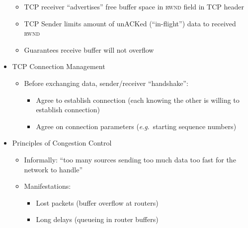 \begin{itemize}
\begin{itemize}
\begin{itemize}
        \end{itemize}

      \item TCP receiver ``advertises'' free buffer space in \textsc{rwnd} field in TCP header

      \item TCP Sender limits amount of unACKed (``in-flight'') data to received \textsc{rwnd}

      \item Guarantees receive buffer will not overflow

    \end{itemize}

  \item TCP Connection Management

    \begin{itemize}

      \item Before exchanging data, sender/receiver ``handshake'':

        \begin{itemize}

          \item Agree to establish connection (each knowing the other is willing to establish connection)

          \item Agree on connection parameters (\textit{e}.\textit{g}.\ starting sequence numbers)

        \end{itemize}

    \end{itemize}

  \item Principles of Congestion Control

    \begin{itemize}

      \item Informally: ``too many sources sending too much data too fast for the network to handle''

      \item Manifestations:

        \begin{itemize}

          \item Lost packets (buffer overflow at routers)

          \item Long delays (queueing in router buffers)


\end{itemize}
\end{itemize}
\end{itemize}
